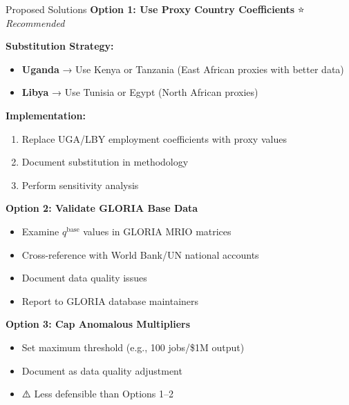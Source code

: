 \documentclass[10pt]{beamer}
\begin{document}
\begin{frame}{Proposed Solutions}
\textbf{Option 1: Use Proxy Country Coefficients} ⭐ \textit{Recommended}

\vspace{0.2cm}

\textbf{Substitution Strategy:}
\begin{itemize}
    \item \textbf{Uganda} → Use Kenya or Tanzania (East African proxies with better data)
    \item \textbf{Libya} → Use Tunisia or Egypt (North African proxies)
\end{itemize}

\vspace{0.2cm}

\textbf{Implementation:}
\begin{enumerate}
    \item Replace UGA/LBY employment coefficients with proxy values
    \item Document substitution in methodology
    \item Perform sensitivity analysis
\end{enumerate}

\vspace{0.5cm}

\textbf{Option 2: Validate GLORIA Base Data}

\vspace{0.2cm}

\begin{itemize}
    \item Examine $q^{\text{base}}$ values in GLORIA MRIO matrices
    \item Cross-reference with World Bank/UN national accounts
    \item Document data quality issues
    \item Report to GLORIA database maintainers
\end{itemize}

\vspace{0.5cm}

\textbf{Option 3: Cap Anomalous Multipliers}

\vspace{0.2cm}

\begin{itemize}
    \item Set maximum threshold (e.g., 100 jobs/\$1M output)
    \item Document as data quality adjustment
    \item ⚠️ Less defensible than Options 1--2
\end{itemize}
\end{frame}
\end{document}
